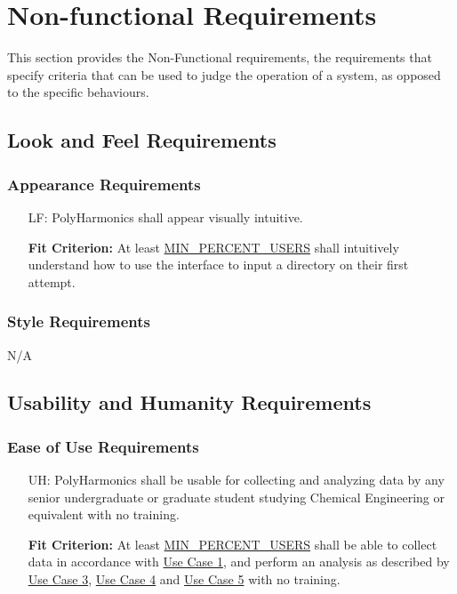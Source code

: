 \documentclass[12pt]{article}
\newcounter{lafnum}
\newcounter{uahnum}
\newcommand{\progname}{PolyHarmonics}
\begin{document}
\begin{itemize}

\end{itemize}

\section{Non-functional Requirements}

This section provides the Non-Functional requirements, the requirements that
specify criteria that can be used to judge the operation of a system, as opposed
to the specific behaviours.

\subsection{Look and Feel Requirements}

\subsubsection{Appearance Requirements}
\noindent \begin{itemize}
\item[LF\refstepcounter{lafnum}\thelafnum\label{NF_laf1}:] \progname{} shall
  appear visually intuitive.
						
  \textbf{Fit Criterion:} At least \hyperref[AppendA]{MIN\_PERCENT\_USERS}
  shall intuitively understand how to use the interface to input a directory on
  their first attempt.
\end{itemize}

\subsubsection{Style Requirements}

N/A

\subsection{Usability and Humanity Requirements}

\subsubsection{Ease of Use Requirements}

\noindent \begin{itemize}
\item[UH\refstepcounter{uahnum}\theuahnum\label{NF_uah1}:] \progname{} shall be
  usable for collecting and analyzing data by any senior
  undergraduate or graduate student studying Chemical Engineering or equivalent
  with no training.

  \textbf{Fit Criterion:} At least \hyperref[AppendA]{MIN\_PERCENT\_USERS}
  shall be able to collect data in accordance with \hyperref[UseCase]{Use Case 
1}, and perform an analysis as described by \hyperref[UseCase]{Use Case 
3}, \hyperref[UseCase]{Use Case 4} and \hyperref[UseCase]{Use Case 5}
 with no training.
\end{itemize}
\end{document}
